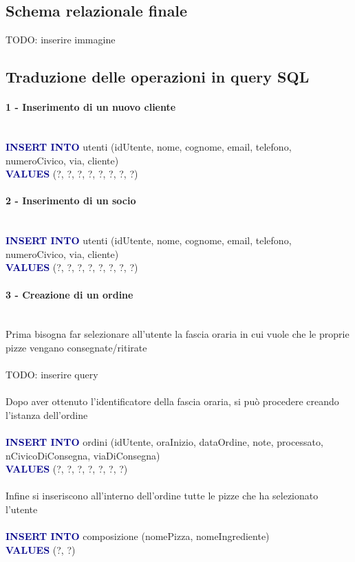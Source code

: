 \documentclass[a4paper,12pt, oneside]{article}
\begin{document}
\subsection{Schema relazionale finale}

TODO: inserire immagine

\subsection{Traduzione delle operazioni in query SQL}

\paragraph{1 - Inserimento di un nuovo cliente}
\hphantom{A}\\    %
\textcolor{darkBlue}{\textbf{INSERT INTO}} utenti (idUtente, nome, cognome, email, telefono, numeroCivico, via, cliente)
\\\textcolor{darkBlue}{\textbf{VALUES}} (?, ?, ?, ?, ?, ?, ?, ?)

\paragraph{2 - Inserimento di un socio}
\hphantom{A}\\    %
\textcolor{darkBlue}{\textbf{INSERT INTO}} utenti (idUtente, nome, cognome, email, telefono, numeroCivico, via, cliente)
\\\textcolor{darkBlue}{\textbf{VALUES}} (?, ?, ?, ?, ?, ?, ?, ?)

\paragraph{3 - Creazione di un ordine}
\hphantom{A}\\    %
Prima bisogna far selezionare all'utente la fascia oraria in cui vuole che le proprie pizze vengano consegnate/ritirate
\\\\
TODO: inserire query
\\\\
Dopo aver ottenuto l'identificatore della fascia oraria, si può procedere creando l'istanza dell'ordine
\\\\
\textcolor{darkBlue}{\textbf{INSERT INTO}} ordini (idUtente, oraInizio, dataOrdine, note, processato, nCivicoDiConsegna, viaDiConsegna)
\\\textcolor{darkBlue}{\textbf{VALUES}} (?, ?, ?, ?, ?, ?, ?)
\\\\
Infine si inseriscono all'interno dell'ordine tutte le pizze che ha selezionato l'utente
\\\\
\textcolor{darkBlue}{\textbf{INSERT INTO}} composizione (nomePizza, nomeIngrediente)
\\\textcolor{darkBlue}{\textbf{VALUES}} (?, ?)
\end{document}
